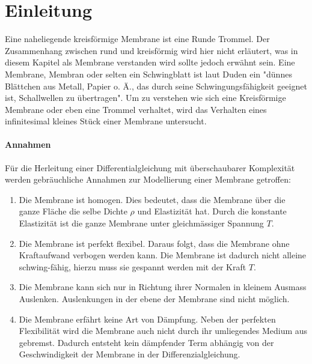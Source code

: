 %
%
%
\section{Einleitung\label{kreismembran:section:teil0}}
Eine naheliegende kreisförmige Membrane ist eine Runde Trommel. 
Der Zusammenhang zwischen rund und kreisförmig wird hier nicht erläutert, was in diesem Kapitel als Membrane verstanden wird sollte jedoch erwähnt sein. 
Eine Membrane, Membran oder selten ein Schwingblatt ist laut Duden \cite{kreismembran:Duden:Membrane} ein "dünnes Blättchen aus Metall, Papier o. Ä., das durch seine Schwingungsfähigkeit geeignet ist, Schallwellen zu übertragen". 
Um zu verstehen wie sich eine Kreisförmige Membrane oder eben eine Trommel verhaltet, wird das Verhalten eines infinitesimal kleines Stück einer Membrane untersucht.     

\paragraph{Annahmen} Für die Herleitung einer Differentialgleichung mit überschaubarer Komplexität werden gebräuchliche Annahmen zur Modellierung einer Membrane \cite{kreismembran:wellengleichung_herleitung} getroffen: 
\begin{enumerate}[i]
	\item Die Membrane ist homogen. 
	Dies bedeutet, dass die Membrane über die ganze Fläche die selbe Dichte $ \rho $  und Elastizität hat. 
	Durch die konstante Elastizität ist die ganze Membrane unter gleichmässiger Spannung $ T $.
	\item Die Membrane ist perfekt flexibel. 
	Daraus folgt, dass die Membrane ohne Kraftaufwand verbogen werden kann. 
	Die Membrane ist dadurch nicht alleine schwing-fähig, hierzu muss sie gespannt werden mit der Kraft $ T $.
	\item Die Membrane kann sich nur in Richtung ihrer Normalen in kleinem Ausmass Auslenken.
	Auslenkungen in der ebene der Membrane sind nicht möglich.
	\item Die Membrane erfährt keine Art von Dämpfung. 
	Neben der perfekten Flexibilität wird die Membrane auch nicht durch ihr umliegendes Medium aus gebremst.
	Dadurch entsteht kein dämpfender Term abhängig von der Geschwindigkeit der Membrane in der Differenzialgleichung. 
\end{enumerate}

